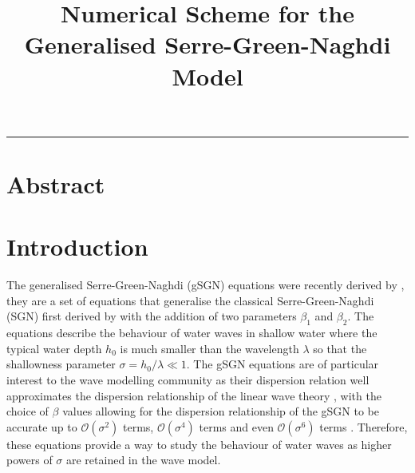 \documentclass[10pt]{elsarticle}
\title{Numerical Scheme for the Generalised Serre-Green-Naghdi Model}
\begin{document}
\maketitle

\vspace{-0.3in}
\noindent
\rule{\linewidth}{0.4pt}

%


\section{Abstract}



\section{Introduction}
The generalised Serre-Green-Naghdi (gSGN) equations were recently derived by \citet{Clamond-Dutykh-2018-237}, they are a set of equations that generalise the classical Serre-Green-Naghdi (SGN) first derived by \citet{Serre-F-1953-857} with the addition of two parameters $\beta_1$ and $\beta_2$. The equations describe the behaviour of water waves in shallow water where the typical water depth $h_0$ is much smaller than the wavelength $\lambda$ so that the shallowness parameter $\sigma = h_0/\lambda \ll 1$. The gSGN equations are of particular interest to the wave modelling community as their dispersion relation well approximates the dispersion relationship of the linear wave theory \cite{Whitham-1967-399}, with the choice of $\beta$ values allowing for the dispersion relationship of the gSGN to be accurate up to $\mathcal{O}\left(\sigma^2\right)$ terms, $\mathcal{O}\left(\sigma^4\right)$ terms and even $\mathcal{O}\left(\sigma^6\right)$ terms \cite{Clamond-Dutykh-2018-237,Clamond-et.al-2017-245}. Therefore, these equations provide a way to study the behaviour of water waves as higher powers of $\sigma$ are retained in the wave model. 
\end{document}

